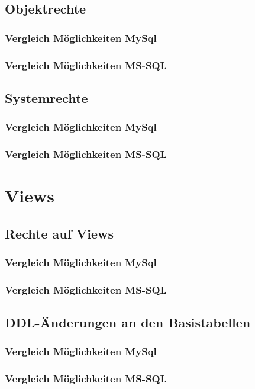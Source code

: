 \documentclass[11pt,a4paper,parskip=half]{scrartcl}
\begin{document}
\subsection{Objektrechte}
\subsubsection{Vergleich Möglichkeiten MySql}
\subsubsection{Vergleich Möglichkeiten MS-SQL}

\subsection{Systemrechte}
\subsubsection{Vergleich Möglichkeiten MySql}
\subsubsection{Vergleich Möglichkeiten MS-SQL}

\section{Views}
\subsection{Rechte auf Views}
\subsubsection{Vergleich Möglichkeiten MySql}
\subsubsection{Vergleich Möglichkeiten MS-SQL}

\subsection{DDL-Änderungen an den Basistabellen}
\subsubsection{Vergleich Möglichkeiten MySql}
\subsubsection{Vergleich Möglichkeiten MS-SQL}
\end{document}
